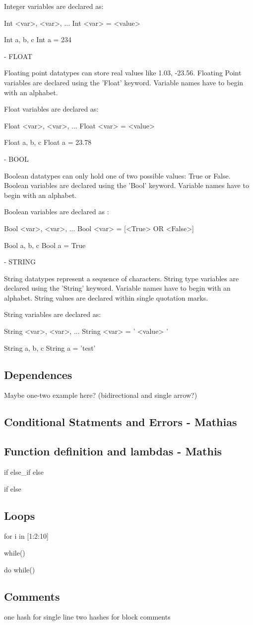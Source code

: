 Integer variables are declared as:

Int <var>, <var>, ...
Int <var> = <value>

Int a, b, c
Int a = 234


- FLOAT

Floating point datatypes can store real values like 1.03, -23.56. Floating Point variables are declared using the 'Float' keyword. Variable names have to begin with an alphabet.

Float variables are declared as:

Float <var>, <var>, ...
Float <var> = <value>

Float a, b, c
Float a = 23.78


- BOOL

Boolean datatypes can only hold one of two possible values: True or False. Boolean variables are declared using the 'Bool' keyword. Variable names have to begin with an alphabet.

Boolean variables are declared as :

Bool <var>, <var>, ...
Bool <var> = [<True> OR <False>]

Bool a, b, c
Bool a = True



- STRING

String datatypes represent a sequence of characters. String type variables are declared using the 'String' keyword. Variable names have to begin with an alphabet. String values are declared within single quotation marks.

String variables are declared as:

String <var>, <var>, ...
String <var> = ' <value> '

String a, b, c
String a = 'test'


\subsection{Dependences}
Maybe one-two example here? (bidirectional and single arrow?)

\subsection{Conditional Statments and Errors - Mathias}

\subsection{Function definition and lambdas - Mathis}

if {}
else\_if {}
else{}

if {}
else{}


\subsection{Loops}
for i in [1:2:10]{}

while(){}

do{}
while()



\subsection{Comments}
one hash for single line
two hashes for block comments


\label{sect:core}
